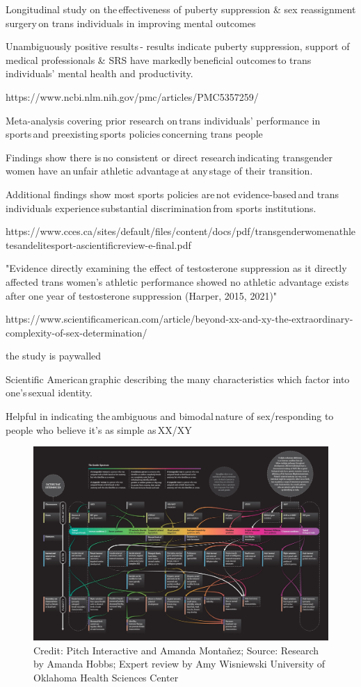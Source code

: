 \documentclass[12 pt, a4paper]{article}
\begin{document}
Longitudinal study on the effectiveness of puberty suppression \& sex reassignment surgery on trans individuals in improving mental outcomes 

Unambiguously positive results - results indicate puberty suppression, support of medical professionals \& SRS have markedly beneficial outcomes to trans individuals’ mental health and productivity. 

\bigskip

https://www.ncbi.nlm.nih.gov/pmc/articles/PMC5357259/ 

Meta-analysis covering prior research on trans individuals’ performance in sports and preexisting sports policies concerning trans people 

Findings show there is no consistent or direct research indicating transgender women have an unfair athletic advantage at any stage of their transition. 

Additional findings show most sports policies are not evidence-based and trans individuals experience substantial discrimination from sports institutions. 

\bigskip

https://www.cces.ca/sites/default/files/content/docs/pdf/transgenderwomenathletesandelitesport-ascientificreview-e-final.pdf 

"Evidence directly examining the effect of testosterone suppression as it directly affected trans women’s athletic performance showed no athletic advantage exists after one year of testosterone suppression (Harper, 2015, 2021)" 

https://www.scientificamerican.com/article/beyond-xx-and-xy-the-extraordinary-complexity-of-sex-determination/ 

the study is paywalled 

Scientific American graphic describing the many characteristics which factor into one's sexual identity.

Helpful in indicating the ambiguous and bimodal nature of sex/responding to people who believe it’s as simple as XX/XY 

\begin{figure}[ht]
\includegraphics[width=\textwidth]{beyond-xx-and-xy.png}
\caption{Credit: Pitch Interactive and Amanda Montañez; Source: Research by Amanda Hobbs; Expert review by Amy Wisniewski University of Oklahoma Health Sciences Center}
\end{figure}
\end{document}
